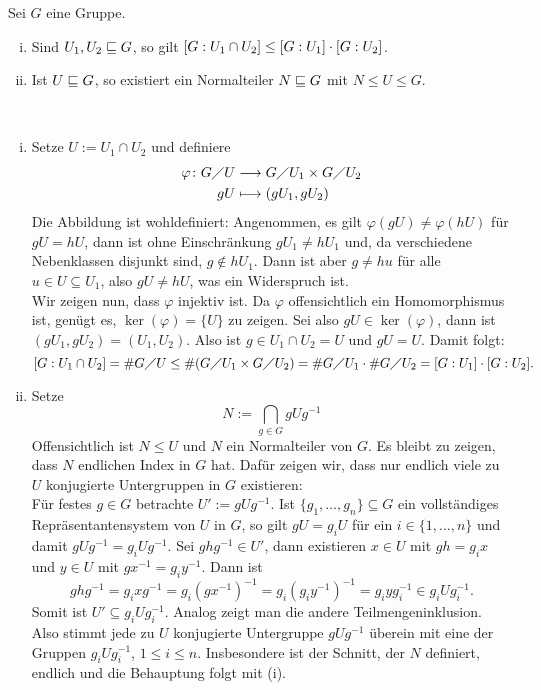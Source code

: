 \begin{proposition}
\label{prop_subfi_NT}
	Sei $G$ eine Gruppe.
	\begin{enumerate}[(i)]
		\item Sind $U_1, U_2 \sqsubseteq G$, so gilt $\left\lbrack G:U_1 \cap U_2\right\rbrack \leq \left\lbrack G:U_1\right\rbrack \cdot \left\lbrack G:U_2\right\rbrack$.
		\item Ist $U \sqsubseteq G$, so existiert ein Normalteiler $N \sqsubseteq G$ mit $N \leq U \leq G$.
	\end{enumerate}
\end{proposition}
\newpage
\begin{beweis}
	\mbox{} \\[-1cm]
	\begin{enumerate}[(i)]
		\item Setze $U := U_1 \cap U_2$ und definiere
		\begin{equation}
		\begin{aligned}
			\varphi \colon G \diagup U &\longrightarrow G \diagup U_1 \times G \diagup U_2 \\
			gU &\longmapsto (gU_1,gU_2)
		\end{aligned}
		\end{equation}
	Die Abbildung ist wohldefiniert: Angenommen, es gilt $\varphi(gU) \neq \varphi(hU)$ für $gU = hU$, dann ist ohne Einschränkung $gU_1 \neq hU_1$ und, da verschiedene Nebenklassen disjunkt sind, $g \notin hU_1$. Dann ist aber $g \neq hu$ für alle $u \in U \subseteq U_1$, also $gU \neq hU$, was ein Widerspruch ist. \\
	Wir zeigen nun, dass $\varphi$ injektiv ist. Da $\varphi$ offensichtlich ein Homomorphismus ist, genügt es, $\ker(\varphi) = \{U\}$ zu zeigen. Sei also $gU \in \ker(\varphi)$, dann ist $(gU_1,gU_2) = (U_1,U_2)$. Also ist $g \in U_1 \cap U_2 = U$ und $gU = U$. Damit folgt:
	\[
		\gind{G : U_1 \cap U_2} = \#G \diagup U \leq \#(G \diagup U_1 \times G \diagup U_2) = \#G \diagup U_1 \cdot \#G \diagup U_2 = \gind{G : U_1} \cdot \gind{G : U_2}.
	\]
	\item Setze
	\[
		N := \bigcap_{g \in G} g U g^{-1}
	\]
	Offensichtlich ist $N \leq U$ und $N$ ein Normalteiler von $G$. Es bleibt zu zeigen, dass $N$ endlichen Index in $G$ hat. Dafür zeigen wir, dass nur endlich viele zu $U$ konjugierte Untergruppen in $G$ existieren: \\
	Für festes $g \in G$ betrachte $U' := gUg^{-1}$. Ist $\{g_1,\dots,g_n\} \subseteq G$ ein vollständiges Repräsentantensystem von $U$ in $G$, so gilt $gU = g_i U$ für ein $i \in \{1, \dots, n\}$ und damit $gUg^{-1} = g_i U g^{-1}$. Sei $ghg^{-1} \in U'$, dann existieren $x \in U$ mit $gh = g_i x$ und $y \in U$ mit $gx^{-1} = g_iy^{-1}$. Dann ist
	\[
		ghg^{-1} = g_i xg^{-1} = g_i(gx^{-1})^{-1} = g_i(g_i y^{-1})^{-1} = g_i y g_i^{-1} \in g_i U g_i^{-1}.
	\]
	Somit ist $U' \subseteq g_i U g_i^{-1}$. Analog zeigt man die andere Teilmengeninklusion. Also stimmt jede zu $U$ konjugierte Untergruppe $gUg^{-1}$ überein mit eine der Gruppen $g_i U g_i^{-1}$, $1 \leq i \leq n$. Insbesondere ist der Schnitt, der $N$ definiert, endlich und die Behauptung folgt mit (i). \qedhere
	\end{enumerate}
\end{beweis}

